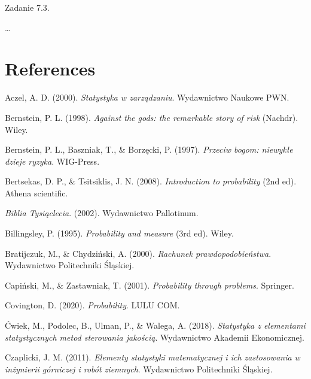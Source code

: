 \documentclass[
  letterpaper,
  DIV=11,
  numbers=noendperiod]{scrreprt}
\newlength{\cslhangindent}
\newenvironment{CSLReferences}[2] %
 {\begin{list}{}{%
  \setlength{\itemindent}{0pt}
  \setlength{\leftmargin}{0pt}
  \setlength{\parsep}{0pt}
  \ifodd #1
   \setlength{\leftmargin}{\cslhangindent}
   \setlength{\itemindent}{-1\cslhangindent}
  \fi
  \setlength{\itemsep}{#2\baselineskip}}}
 {\end{list}}
\begin{document}
Zadanie 7.3.

\ldots{}


\chapter*{References}\label{references}


\label{refs}
\begin{CSLReferences}{1}{0}
Aczel, A. D. (2000). \emph{Statystyka w zarz{ą}dzaniu}. Wydawnictwo
Naukowe PWN.

Bernstein, P. L. (1998). \emph{Against the gods: the remarkable story of
risk} (Nachdr). Wiley.

Bernstein, P. L., Baszniak, T., \& Borzęcki, P. (1997). \emph{Przeciw
bogom: niewyk{ł}e dzieje ryzyka}. WIG-Press.

Bertsekas, D. P., \& Tsitsiklis, J. N. (2008). \emph{Introduction to
probability} (2nd ed). Athena scientific.

\emph{Biblia Tysiąclecia}. (2002). Wydawnictwo Pallotinum.

Billingsley, P. (1995). \emph{Probability and measure} (3rd ed). Wiley.

Bratijczuk, M., \& Chydziński, A. (2000). \emph{Rachunek
prawdopodobie{ń}stwa}. Wydawnictwo Politechniki {Ś}l{ą}skiej.

Capiński, M., \& Zastawniak, T. (2001). \emph{Probability through
problems}. Springer.

Covington, D. (2020). \emph{Probability}. LULU COM.

Ćwiek, M., Podolec, B., Ulman, P., \& Walega, A. (2018).
\emph{Statystyka z elementami statystycznych metod sterowania
jako{ś}ci{ą}}. Wydawnictwo Akademii Ekonomicznej.

Czaplicki, J. M. (2011). \emph{Elementy statystyki matematycznej i ich
zastosowania w in{ż}ynierii górniczej i robót ziemnych}. Wydawnictwo
Politechniki {Ś}l{ą}skiej.


\end{CSLReferences}
\end{document}
